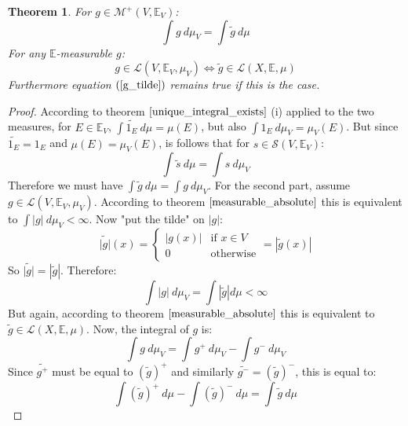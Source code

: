 \documentclass[12pt, a4paper]{article}
\newtheorem{theorem}{Theorem}[section]
\numberwithin{equation}{section}
\begin{document}
\begin{theorem}
For $g\in\mathcal{M}^+(V,\mathbb{E}_V)$:
\begin{equation}
\label{g_tilde}
\int g\ d\mu_V=\int\tilde{g}\ d\mu
\end{equation}
For any $\mathbb{E}$-measurable $g$:
\begin{equation}
g\in\mathcal{L}(V,\mathbb{E}_V,\mu_V)\Leftrightarrow \tilde{g}\in\mathcal{L}(X,\mathbb{E},\mu)
\end{equation}
Furthermore equation $(\ref{g_tilde})$ remains true if this is the case.
\end{theorem}
\begin{proof}
According to theorem $\ref{unique_integral_exists}$ (i) applied to the two measures, for $E\in\mathbb{E}_V$, $\int \widetilde{1_E}\ d\mu=\mu(E)$, but also $\int 1_E\ d\mu_V=\mu_V(E)$. But since $\widetilde{1_E}=1_E$ and $\mu(E)=\mu_V(E)$, is follows that for $s\in\mathcal{S}(V,\mathbb{E}_V)$:
\begin{equation}
\int \tilde{s}\ d\mu=\int s\ d\mu_V
\end{equation}
Therefore we must have $\int\tilde{g}\ d\mu=\int g\ d\mu_V$.
For the second part, assume $g\in\mathcal{L}(V,\mathbb{E}_V,\mu_V)$. According to theorem $\ref{measurable_absolute}$ this is equivalent to $\int|g|\ d\mu_V<\infty$. Now "put the tilde" on $|g|$:
\begin{equation}
\widetilde{|g|}(x)=
\begin{cases}
|g(x)|	& \textrm{if }x\in V \\
0		& \textrm{otherwise}
\end{cases}
=|\tilde{g}(x)|
\end{equation}
So $\widetilde{|g|}=|\tilde{g}|$. Therefore:
\begin{equation}
\int|g|\ d\mu_V=\int |\tilde{g}|d\mu<\infty
\end{equation}
But again, according to theorem $\ref{measurable_absolute}$ this is equivalent to $\tilde{g}\in\mathcal{L}(X,\mathbb{E},\mu)$. Now, the integral of $g$ is:
\begin{equation}
\int g\ d\mu_V=\int g^+\ d\mu_V-\int g^-\ d\mu_V
\end{equation}
Since $\widetilde{g^+}$ must be equal to $(\tilde{g})^+$ and similarly $\widetilde{g^-}=(\tilde{g})^-$, this is equal to:
\begin{equation}
\int(\tilde{g})^+\ d\mu-\int(\tilde{g})^-\ d\mu=\int\tilde{g}\ d\mu
\end{equation}
\end{proof}
\end{document}
